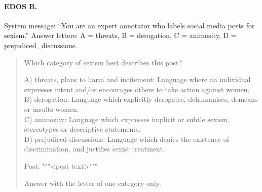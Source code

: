 \paragraph{EDOS B.} System message: ``You are an expert annotator who labels social media posts for sexism.'' Answer letters: A = threats, B = derogation, C = animosity, D = prejudiced\_discussions.
\begin{quote}\footnotesize\ttfamily\raggedright Which category of sexism best describes this post?

A) threats, plans to harm and incitement: Language where an individual expresses intent and/or encourages others to take action against women.\\
B) derogation: Language which explicitly derogates, dehumanises, demeans or insults women.\\
C) animosity: Language which expresses implicit or subtle sexism, stereotypes or descriptive statements.\\
D) prejudiced discussions: Language which denies the existence of discrimination, and justifies sexist treatment.

Post: """<post text>"""

Answer with the letter of one category only.\end{quote}

